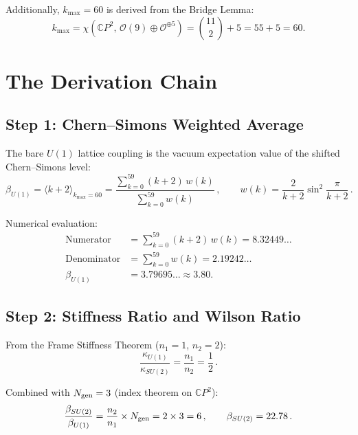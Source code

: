 \documentclass[12pt,a4paper]{article}
\begin{document}
Additionally, $k_{\max} = 60$ is derived from the Bridge Lemma:
\begin{equation}
k_{\max} = \chi(\mathbb{C}P^2,\,\mathcal{O}(9) \oplus \mathcal{O}^{\oplus 5})
= \binom{11}{2} + 5 = 55 + 5 = 60.
\end{equation}

\section{The Derivation Chain}

\subsection{Step 1: Chern--Simons Weighted Average}

The bare $U(1)$ lattice coupling is the vacuum expectation value of the
shifted Chern--Simons level:
\begin{equation}
\beta_{U(1)} = \langle k + 2 \rangle_{k_{\max}=60}
= \frac{\sum_{k=0}^{59}(k+2)\,w(k)}{\sum_{k=0}^{59}w(k)}\,,
\qquad w(k) = \frac{2}{k+2}\sin^2\!\frac{\pi}{k+2}\,.
\end{equation}

Numerical evaluation:
\begin{align}
\text{Numerator} &= \sum_{k=0}^{59}(k+2)\,w(k) = 8.32449\ldots \\
\text{Denominator} &= \sum_{k=0}^{59} w(k) = 2.19242\ldots \\
\beta_{U(1)} &= 3.79695\ldots \approx 3.80.
\end{align}

\subsection{Step 2: Stiffness Ratio and Wilson Ratio}

From the Frame Stiffness Theorem ($n_1 = 1$, $n_2 = 2$):
\begin{equation}
\frac{\kappa_{U(1)}}{\kappa_{SU(2)}} = \frac{n_1}{n_2} = \frac{1}{2}\,.
\end{equation}

Combined with $N_{\rm gen} = 3$ (index theorem on $\mathbb{C}P^2$):
\begin{equation}
\frac{\beta_{SU(2)}}{\beta_{U(1)}} = \frac{n_2}{n_1} \times N_{\rm gen}
= 2 \times 3 = 6\,,
\qquad \beta_{SU(2)} = 22.78\,.
\end{equation}
\end{document}
